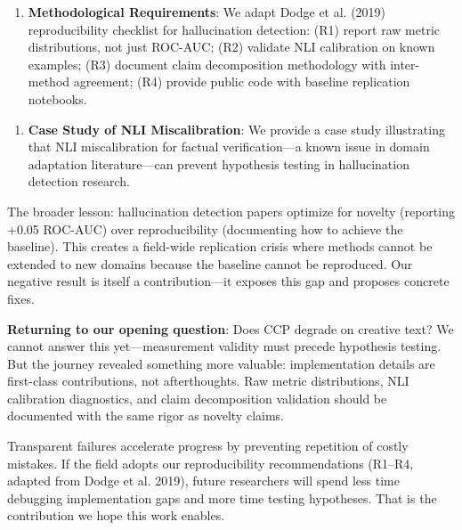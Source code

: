 \begin{enumerate}
\item \textbf{Methodological Requirements}: We adapt Dodge et al. (2019) reproducibility checklist for hallucination detection: (R1) report raw metric distributions, not just ROC-AUC; (R2) validate NLI calibration on known examples; (R3) document claim decomposition methodology with inter-method agreement; (R4) provide public code with baseline replication notebooks.
\end{enumerate}

\begin{enumerate}
\item \textbf{Case Study of NLI Miscalibration}: We provide a case study illustrating that NLI miscalibration for factual verification---a known issue in domain adaptation literature---can prevent hypothesis testing in hallucination detection research.
\end{enumerate}

The broader lesson: hallucination detection papers optimize for novelty (reporting +0.05 ROC-AUC) over reproducibility (documenting how to achieve the baseline). This creates a field-wide replication crisis where methods cannot be extended to new domains because the baseline cannot be reproduced. Our negative result is itself a contribution---it exposes this gap and proposes concrete fixes.

\textbf{Returning to our opening question}: Does CCP degrade on creative text? We cannot answer this yet---measurement validity must precede hypothesis testing. But the journey revealed something more valuable: implementation details are first-class contributions, not afterthoughts. Raw metric distributions, NLI calibration diagnostics, and claim decomposition validation should be documented with the same rigor as novelty claims.

Transparent failures accelerate progress by preventing repetition of costly mistakes. If the field adopts our reproducibility recommendations (R1--R4, adapted from Dodge et al. 2019), future researchers will spend less time debugging implementation gaps and more time testing hypotheses. That is the contribution we hope this work enables.
